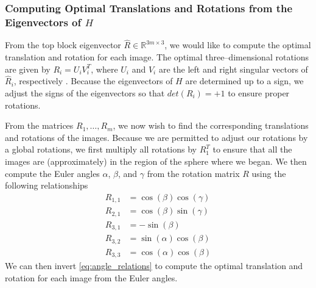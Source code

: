 \documentclass[11pt]{article}
\begin{document}
\subsubsection{Computing Optimal Translations and Rotations from the Eigenvectors of $H$}

From the top block eigenvector $\hat{R} \in \mathbb{R}^{3m \times 3}$, we would like to compute the optimal translation and rotation for each image. 
%
The optimal three--dimensional rotations are given by $R_i = U_i V_i^T$, where $U_i$ and $V_i$ are the left and right singular vectors of $\hat{R}_i$, respectively \cite{...}. 
%
Because the eigenvectors of $H$ are determined up to a sign, we adjust the signs of the eigenvectors so that $det(R_i) = +1$ to ensure proper rotations.

From the matrices $R_1, \dots, R_m$, we now wish to find the corresponding translations and rotations of the images.
%
Because we are permitted to adjust our rotations by a global rotations, we first multiply all rotations by $R_1^T$ to ensure that all the images are (approximately) in the region of the sphere where we began.
%
We then compute the Euler angles $\alpha$, $\beta$, and $\gamma$ from the rotation matrix $R$ using the following relationships
\begin{equation}
\begin{aligned}
R_{1,1} & = \cos(\beta)\cos(\gamma) \\
R_{2,1} & = \cos(\beta)\sin(\gamma) \\
R_{3,1} & = -\sin(\beta) \\
R_{3,2} & = \sin(\alpha)\cos(\beta) \\
R_{3,3} & = \cos(\alpha)\cos(\beta) 
\end{aligned}
\end{equation}
%
We can then invert \eqref{eq:angle_relations} to compute the optimal translation and rotation for each image from the Euler angles.



\end{document}
